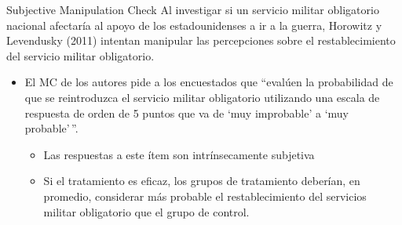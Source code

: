 \documentclass[
  ignorenonframetext,
]{beamer}
\providecommand{\tightlist}{%
  \setlength{\itemsep}{0pt}\setlength{\parskip}{0pt}}
\begin{document}
\begin{frame}{Subjective Manipulation Check}
\protect\hypertarget{subjective-manipulation-check}{}
Al investigar si un servicio militar obligatorio nacional afectaría al
apoyo de los estadounidenses a ir a la guerra, Horowitz y Levendusky
(2011) intentan manipular las percepciones sobre el restablecimiento del
servicio militar obligatorio.

\begin{itemize}
\tightlist
\item
  El MC de los autores pide a los encuestados que ``evalúen la
  probabilidad de que se reintroduzca el servicio militar obligatorio
  utilizando una escala de respuesta de orden de 5 puntos que va de `muy
  improbable' a `muy probable'\,''.

  \begin{itemize}
  \tightlist
  \item
    Las respuestas a este ítem son intrínsecamente subjetiva
  \item
    Si el tratamiento es eficaz, los grupos de tratamiento deberían, en
    promedio, considerar más probable el restablecimiento del servicios
    militar obligatorio que el grupo de control.
  \end{itemize}
\end{itemize}
\end{frame}

\end{document}
